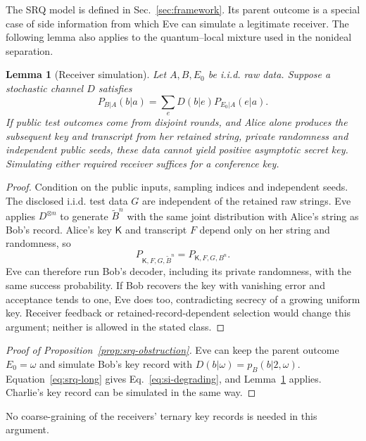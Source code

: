 \documentclass[aps,10pt,onecolumn,prx,superscriptaddress,longbibliography,nofootinbib]{revtex4-2}
\newtheorem{lemma}[theorem]{Lemma}
\begin{document}
The SRQ model is defined in Sec.~\ref{sec:framework}. Its parent outcome is a special case of side information from which Eve can simulate a legitimate receiver. The following lemma also applies to the quantum--local mixture used in the nonideal separation.

\begin{lemma}[Receiver simulation]\label{lem:si-simulation}
Let \(A,B,E_0\) be i.i.d. raw data. Suppose a stochastic channel \(D\) satisfies
\begin{equation}
 P_{B|A}(b|a)=\sum_eD(b|e)P_{E_0|A}(e|a).
 \label{eq:si-degrading}
\end{equation}
If public test outcomes come from disjoint rounds, and Alice alone produces the subsequent key and transcript from her retained string, private randomness and independent public seeds, these data cannot yield positive asymptotic secret key. Simulating either required receiver suffices for a conference key.
\end{lemma}
\begin{proof}
Condition on the public inputs, sampling indices and independent seeds. The disclosed i.i.d. test data \(G\) are independent of the retained raw strings. Eve applies \(D^{\otimes n}\) to generate \(\widetilde B^n\) with the same joint distribution with Alice's string as Bob's record. Alice's key \(\mathsf K\) and transcript \(F\) depend only on her string and randomness, so
\begin{equation}
 P_{\mathsf K,F,G,\widetilde B^n}=P_{\mathsf K,F,G,B^n}.
 \label{eq:si-simulation-transcript}
\end{equation}
Eve can therefore run Bob's decoder, including its private randomness, with the same success probability. If Bob recovers the key with vanishing error and acceptance tends to one, Eve does too, contradicting secrecy of a growing uniform key. Receiver feedback or retained-record-dependent selection would change this argument; neither is allowed in the stated class.
\end{proof}

\begin{proof}[Proof of Proposition~\ref{prop:srq-obstruction}]
Eve can keep the parent outcome \(E_0=\omega\) and simulate Bob's key record with \(D(b|\omega)=p_B(b|2,\omega)\). Equation~\eqref{eq:srq-long} gives Eq.~\eqref{eq:si-degrading}, and Lemma~\ref{lem:si-simulation} applies. Charlie's key record can be simulated in the same way.
\end{proof}
No coarse-graining of the receivers' ternary key records is needed in this argument.
\end{document}
